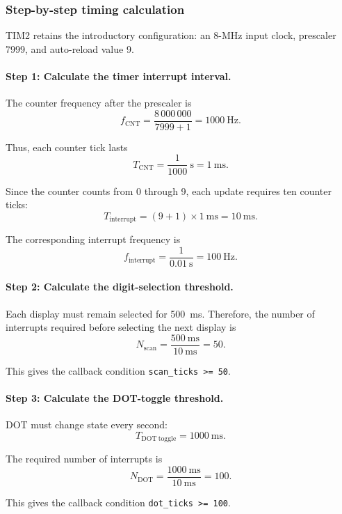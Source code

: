 \documentclass[a4paper]{article}
\begin{document}
\subsubsection{Step-by-step timing calculation}

TIM2 retains the introductory configuration:
an 8-MHz input clock, prescaler 7999, and
auto-reload value 9.

\paragraph{Step 1: Calculate the timer interrupt interval.}

The counter frequency after the prescaler is
\[
    f_{\mathrm{CNT}}
    = \frac{8\,000\,000}{7999+1}
    = 1000~\mathrm{Hz}.
\]

Thus, each counter tick lasts
\[
    T_{\mathrm{CNT}}
    = \frac{1}{1000}~\mathrm{s}
    = 1~\mathrm{ms}.
\]

Since the counter counts from 0 through 9,
each update requires ten counter ticks:
\[
    T_{\mathrm{interrupt}}
    = (9+1)\times 1~\mathrm{ms}
    = 10~\mathrm{ms}.
\]

The corresponding interrupt frequency is
\[
    f_{\mathrm{interrupt}}
    = \frac{1}{0.01~\mathrm{s}}
    = 100~\mathrm{Hz}.
\]

\paragraph{Step 2: Calculate the digit-selection threshold.}

Each display must remain selected for 500~ms.
Therefore, the number of interrupts required
before selecting the next display is
\[
    N_{\mathrm{scan}}
    = \frac{500~\mathrm{ms}}{10~\mathrm{ms}}
    = 50.
\]

This gives the callback condition
\texttt{scan\_ticks >= 50}.

\paragraph{Step 3: Calculate the DOT-toggle threshold.}

DOT must change state every second:
\[
    T_{\mathrm{DOT\ toggle}} = 1000~\mathrm{ms}.
\]

The required number of interrupts is
\[
    N_{\mathrm{DOT}}
    = \frac{1000~\mathrm{ms}}{10~\mathrm{ms}}
    = 100.
\]

This gives the callback condition
\texttt{dot\_ticks >= 100}.
\end{document}
